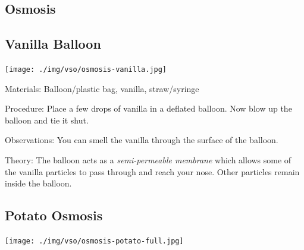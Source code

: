 \begin{multicols}{2}
\columnbreak


\section*{Osmosis}


\subsection{Vanilla Balloon}

\begin{center}
\texttt{[image: ./img/vso/osmosis-vanilla.jpg]}
\end{center}

\begin{description*}
\item[Materials:]{Balloon/plastic bag, vanilla, straw/syringe}
\item[Procedure:]{Place a few drops of vanilla in a deflated balloon. Now blow up the balloon and tie it shut.}
\item[Observations:]{You can smell the vanilla through the surface of the balloon.}
\item[Theory:]{The balloon acts as a \emph{semi-permeable membrane} which allows some of the vanilla particles to pass through and reach your nose. Other particles remain inside the balloon.}
\end{description*}

\subsection{Potato Osmosis}

\begin{center}
\texttt{[image: ./img/vso/osmosis-potato-full.jpg]}
\end{center}


\end{multicols}
